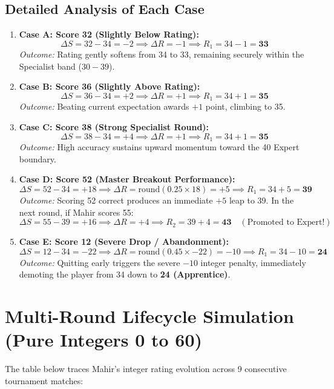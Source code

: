 \subsection{Detailed Analysis of Each Case}
\begin{enumerate}
    \item \textbf{Case A: Score 32 (Slightly Below Rating):}
    $$\Delta S = 32 - 34 = -2 \implies \Delta R = -1 \implies R_1 = 34 - 1 = \mathbf{33}$$
    \textit{Outcome:} Rating gently softens from 34 to 33, remaining securely within the Specialist band ($30-39$).

    \item \textbf{Case B: Score 36 (Slightly Above Rating):}
    $$\Delta S = 36 - 34 = +2 \implies \Delta R = +1 \implies R_1 = 34 + 1 = \mathbf{35}$$
    \textit{Outcome:} Beating current expectation awards $+1$ point, climbing to 35.

    \item \textbf{Case C: Score 38 (Strong Specialist Round):}
    $$\Delta S = 38 - 34 = +4 \implies \Delta R = +1 \implies R_1 = 34 + 1 = \mathbf{35}$$
    \textit{Outcome:} High accuracy sustains upward momentum toward the 40 Expert boundary.

    \item \textbf{Case D: Score 52 (Master Breakout Performance):}
    $$\Delta S = 52 - 34 = +18 \implies \Delta R = \text{round}(0.25 \times 18) = +5 \implies R_1 = 34 + 5 = \mathbf{39}$$
    \textit{Outcome:} Scoring 52 correct produces an immediate $+5$ leap to 39. In the next round, if Mahir scores 55:
    $$\Delta S = 55 - 39 = +16 \implies \Delta R = +4 \implies R_2 = 39 + 4 = \mathbf{43} \quad (\text{Promoted to Expert!})$$

    \item \textbf{Case E: Score 12 (Severe Drop / Abandonment):}
    $$\Delta S = 12 - 34 = -22 \implies \Delta R = \text{round}(0.45 \times -22) = -10 \implies R_1 = 34 - 10 = \mathbf{24}$$
    \textit{Outcome:} Quitting early triggers the severe $-10$ integer penalty, immediately demoting the player from 34 down to \textbf{24 (Apprentice)}.
\end{enumerate}

\section{Multi-Round Lifecycle Simulation (Pure Integers 0 to 60)}
The table below traces Mahir's integer rating evolution across 9 consecutive tournament matches:

